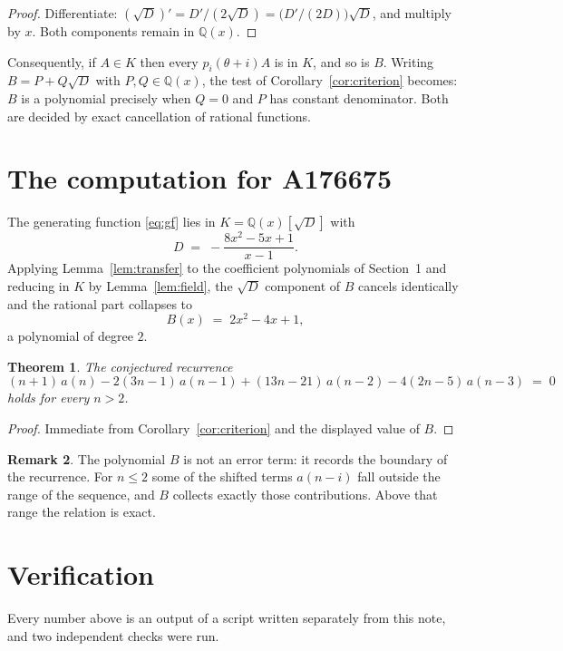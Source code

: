 \documentclass[11pt,a4paper]{article}
\theoremstyle{plain}
\newtheorem{theorem}{Theorem}
\theoremstyle{definition}
\newtheorem{remark}[theorem]{Remark}
\begin{document}
\begin{proof}
Differentiate: $(\sqrt{D})'=D'/(2\sqrt{D})=\bigl(D'/(2D)\bigr)\sqrt{D}$, and multiply by
$x$. Both components remain in $\mathbb{Q}(x)$.
\end{proof}

Consequently, if $A\in K$ then every $p_{i}(\theta+i)A$ is in $K$, and so is $B$. Writing
$B=P+Q\sqrt{D}$ with $P,Q\in\mathbb{Q}(x)$, the test of Corollary~\ref{cor:criterion}
becomes: $B$ is a polynomial precisely when $Q=0$ and $P$ has constant denominator. Both
are decided by exact cancellation of rational functions.

\section{The computation for A176675}

The generating function \eqref{eq:gf} lies in $K=\mathbb{Q}(x)[\sqrt{D}]$ with
\[
D \;=\; - \frac{8 x^{2} - 5 x + 1}{x - 1} .
\]
Applying Lemma~\ref{lem:transfer} to the coefficient polynomials of Section~1 and reducing
in $K$ by Lemma~\ref{lem:field}, the $\sqrt{D}$ component of $B$ cancels identically and
the rational part collapses to
\[
B(x)\;=\;2 x^{2} - 4 x + 1 ,
\]
a polynomial of degree $2$.

\begin{theorem}
The conjectured recurrence
\[
(n + 1)\,a(n) -  2 \left(3 n - 1\right)\,a(n-1) + (13 n - 21)\,a(n-2) -  4 \left(2 n - 5\right)\,a(n-3) \;=\;0
\]
holds for every $n>2$.
\end{theorem}

\begin{proof}
Immediate from Corollary~\ref{cor:criterion} and the displayed value of $B$.
\end{proof}

\begin{remark}
The polynomial $B$ is not an error term: it records the boundary of the recurrence. For
$n\le2$ some of the shifted terms $a(n-i)$ fall outside the range of the sequence,
and $B$ collects exactly those contributions. Above that range the relation is exact.
\end{remark}

\section{Verification}

Every number above is an output of a script written separately from this note, and two
independent checks were run.
\end{document}
